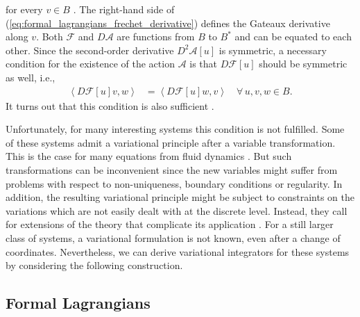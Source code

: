 \documentclass[12pt,a4paper,reqno]{article}
\begin{document}
for every $v \in B$ \cite{Olver:1993, Morrison:1998}. The right-hand side of (\ref{eq:formal_lagrangians_frechet_derivative}) defines the Gateaux derivative along $v$. 
Both $\mathcal{F}$ and ${\ensuremath{D}} \mathcal{A}$ are functions from $B$ to $B^{*}$ and can be equated to each other.
Since the second-order derivative ${\ensuremath{D}}^{2} \mathcal{A} [u]$ is symmetric, a necessary condition for the existence of the action $\mathcal{A}$ is that ${\ensuremath{D}} \mathcal{F} [u]$ 
should be symmetric as well, i.e.,
\begin{align}\label{eq:formal_lagrangians_self_adjointness}
{\ensuremath{\left < { {\ensuremath{D}} \mathcal{F} [{\ensuremath{{\ensuremath{{u}}}}}] {\ensuremath{{\ensuremath{{v}}}}} , {\ensuremath{{\ensuremath{{w}}}}} } \right >}} &= {\ensuremath{\left < { {\ensuremath{D}} \mathcal{F} [{\ensuremath{{\ensuremath{{u}}}}}] {\ensuremath{{\ensuremath{{w}}}}} , {\ensuremath{{\ensuremath{{v}}}}} } \right >}}
\hspace{1em}
\forall \, {\ensuremath{{\ensuremath{{u}}}}}, {\ensuremath{{\ensuremath{{v}}}}}, {\ensuremath{{\ensuremath{{w}}}}} \in B .
\end{align}
It turns out that this condition is also sufficient \cite{Olver:1993, BampiMorro:1982, Tonti:1969}.

Unfortunately, for many interesting systems this condition is not fulfilled.
Some of these systems admit a variational principle after a variable transformation.
This is the case for many equations from fluid dynamics \cite{SeligerWhitham:1968}.
But such transformations can be inconvenient since the new variables might suffer from problems with respect to non-uniqueness, boundary conditions or regularity.
In addition, the resulting variational principle might be subject to constraints on the variations which are not easily dealt with at the discrete level.
Instead, they call for extensions of the theory that complicate its application \cite{Pavlov:2011, Gawlik:2011}.
For a still larger class of systems, a variational formulation is not known, even after a change of coordinates.
Nevertheless, we can derive variational integrators for these systems by considering the following construction.

\subsection{Formal Lagrangians}
\label{sec:adjoint_formal_lagrangians}
\end{document}
